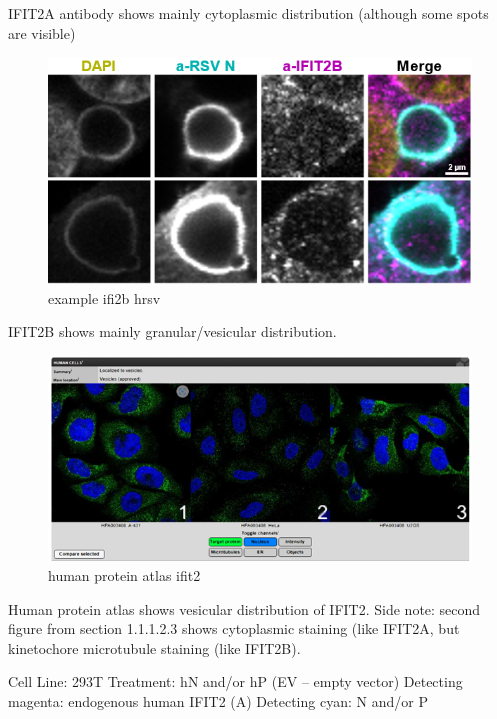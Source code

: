IFIT2A antibody shows mainly cytoplasmic distribution (although some spots are visible)


\begin{figure}
    \centering
    \includegraphics[width=1\linewidth]{09. Chapter 4//Figs//02. I2B/03. i2b a549 hrsv n.png}
    \caption[example ifi2b hrsv]{example ifi2b hrsv}
    \label{example ifi2b hrsv}
\end{figure}

IFIT2B shows mainly granular/vesicular distribution.

\begin{figure}
    \centering
    \includegraphics[width=1\linewidth]{09. Chapter 4//Figs//04. IFIT2AB Discussion/02. human protein atlas ifit2.png}
    \caption[human protein atlas ifit2]{human protein atlas ifit2}
    \label{human protein atlas ifit2}
\end{figure}

Human protein atlas shows vesicular distribution of IFIT2.
Side note: second figure from section 1.1.1.2.3 shows cytoplasmic staining (like IFIT2A, but kinetochore microtubule staining (like IFIT2B).

 \label{P Transfection Induces IFIT2A Signal but not IFIT2B Signal}
Cell Line: 293T \newline
Treatment: hN and/or hP (EV – empty vector) \newline
Detecting magenta: endogenous human IFIT2 (A) \newline
Detecting cyan: N and/or P \newline

